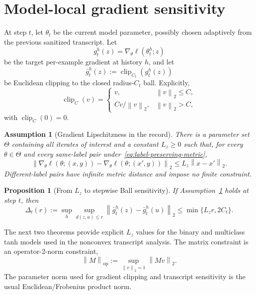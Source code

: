 \documentclass[conference,compsoc]{IEEEtran}
\newtheorem{assumption}{Assumption}
\newtheorem{proposition}{Proposition}
\DeclareMathOperator{\clip}{clip}
\newcommand{\op}{\mathrm{op}}
\newcommand{\norm}[1]{\left\lVert #1\right\rVert}
\begin{document}
\section{Model-local gradient sensitivity}
\label{sec:model-local-sensitivity}

At step $t$, let $\theta_t$ be the current model parameter, possibly chosen
adaptively from the previous sanitized transcript.  Let
\[
g_t^h(z)=\nabla_\theta\ell(\theta_t^h;z)
\]
be the target per-example gradient at history $h$, and let
\[
\bar g_t^h(z):=\clip_{C_t}(g_t^h(z))
\]
be Euclidean clipping to the closed radius-$C_t$ ball.  Explicitly,
\[
\clip_C(v)=
\begin{cases}
v, & \norm{v}_2\le C,\\
C v/\norm{v}_2, & \norm{v}_2>C,
\end{cases}
\]
with $\clip_C(0)=0$.

\begin{assumption}[Gradient Lipschitzness in the record]
\label{assump:lz}
There is a parameter set $\Theta$ containing all iterates of interest and a
constant $L_z\ge0$ such that, for every $\theta\in\Theta$ and every same-label
pair under~\eqref{eq:label-preserving-metric},
\[
\norm{\nabla_\theta\ell(\theta;(x,y))
-
\nabla_\theta\ell(\theta;(x',y))}_2
\le
L_z\norm{x-x'}_2.
\]
Different-label pairs have infinite metric distance and impose no finite
constraint.
\end{assumption}

\begin{proposition}[From $L_z$ to stepwise Ball sensitivity]
\label{prop:lz-to-delta}
If Assumption~\ref{assump:lz} holds at step $t$, then
\[
\Delta_t(r)
:=
\sup_{h}\sup_{d(z,u)\le r}
\norm{\bar g_t^h(z)-\bar g_t^h(u)}_2
\le
\min\{L_z r,2C_t\}.
\]
\end{proposition}

The next two theorems provide explicit $L_z$ values for the binary and
multiclass tanh models used in the nonconvex transcript analysis.  The matrix
constraint is an operator-2-norm constraint,
\[
\norm{M}_{\op}:=\sup_{\norm{v}_2=1}\norm{Mv}_2.
\]
The parameter norm used for gradient clipping and transcript sensitivity is the
usual Euclidean/Frobenius product norm.
\end{document}
